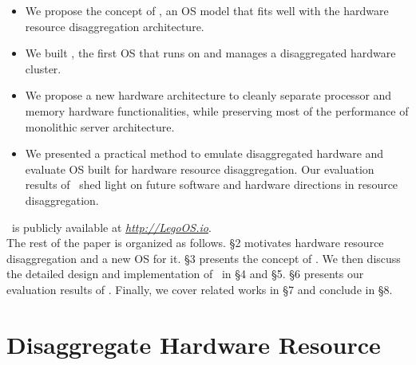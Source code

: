 \documentclass[10pt,times,twocolumn]{z2-article}
\begin{document}
\begin{itemize}

\vspace{-0.05in}
\item We propose the concept of \splitkernel, an OS model that fits well with the hardware resource disaggregation architecture.

\vspace{-0.05in}
\item We built \lego, the first OS that runs on and manages a disaggregated hardware cluster.

\vspace{-0.05in}
\item We propose a new hardware architecture to cleanly separate processor and memory hardware functionalities, 
while preserving most of the performance of monolithic server architecture.

\vspace{-0.05in}
\item We presented a practical method to emulate disaggregated hardware and evaluate OS built for hardware resource disaggregation.
Our evaluation results of \lego\ shed light on future software and hardware directions in resource disaggregation.

\vspace{-0.05in}

\end{itemize}

\lego\ is publicly available at {\small {\em {\url{http://LegoOS.io}}}}.\\

The rest of the paper is organized as follows.
\S{}2 motivates hardware resource disaggregation and a new OS for it.
\S{}3 presents the concept of \splitkernel.
We then discuss the detailed design and implementation of \lego\ in \S{}4 and \S{}5.
\S{}6 presents our evaluation results of \lego.
Finally, we cover related works in \S{}7 and conclude in \S{}8.

\section{Disaggregate Hardware Resource}
\label{sec:motivation}
\end{document}
